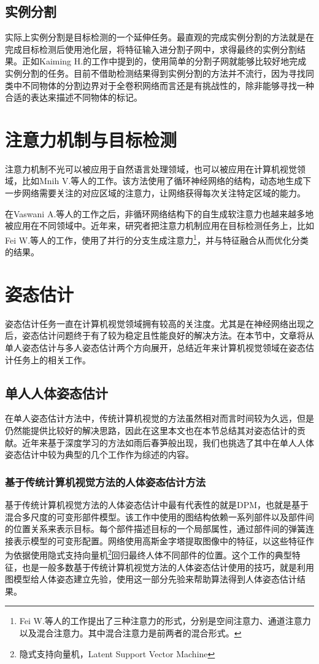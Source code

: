 \subsection{实例分割}
\label{subsec:insseg}
实际上实例分割是目标检测的一个延伸任务。最直观的完成实例分割的方法就是在完成目标检测后使用池化层，将特征输入进分割子网中，求得最终的实例分割结果。正如Kaiming H.\cite{He2017Mask}的工作中提到的，使用简单的分割子网就能够比较好地完成实例分割的任务。目前不借助检测结果得到实例分割的方法并不流行，因为寻找同类中不同物体的分割边界对于全卷积网络而言还是有挑战性的，除非能够寻找一种合适的表达来描述不同物体的标记。

\section{注意力机制与目标检测}
\label{sec:attenandobjdet}
注意力机制不光可以被应用于自然语言处理领域，也可以被应用在计算机视觉领域，比如Mnih V.等人的工作\cite{mnih2014recurrent}。该方法使用了循环神经网络的结构，动态地生成下一步网络需要关注的对应区域的注意力，让网络获得每次关注特定区域的能力。

在Vaswani A.等人的工作\cite{vaswani2017attention}之后，非循环网络结构下的自生成软注意力也越来越多地被应用在不同领域中。近年来，研究者把注意力机制应用在目标检测任务上，比如Fei W.等人的工作\cite{wang2017residual}，使用了并行的分支生成注意力\footnote{Fei W.等人的工作提出了三种注意力的形式，分别是空间注意力、通道注意力以及混合注意力。其中混合注意力是前两者的混合形式。}，并与特征融合从而优化分类的结果。

\section{姿态估计}
\label{sec:poseestimation}
姿态估计任务一直在计算机视觉领域拥有较高的关注度。尤其是在神经网络出现之后，姿态估计问题终于有了较为稳定且性能良好的解决方法。在本节中，文章将从单人姿态估计与多人姿态估计两个方向展开，总结近年来计算机视觉领域在姿态估计任务上的相关工作。
\subsection{单人人体姿态估计}
\label{subsec:singlepose}
在单人姿态估计方法中，传统计算机视觉的方法虽然相对而言时间较为久远，但是仍然能提供比较好的解决思路，因此在这里本文也在本节总结其对姿态估计的贡献。近年来基于深度学习的方法如雨后春笋般出现，我们也挑选了其中在单人人体姿态估计中较为典型的几个工作作为综述的内容。
\subsubsection{基于传统计算机视觉方法的人体姿态估计方法}
\label{subsubsec:legacypose}
基于传统计算机视觉方法的人体姿态估计中最有代表性的就是DPM\cite{felzenszwalb2010object}，也就是基于混合多尺度的可变形部件模型。该工作中使用的图结构依赖一系列部件以及部件间的位置关系来表示目标。每个部件描述目标的一个局部属性，通过部件间的弹簧连接表示模型的可变形配置。网络使用高斯金字塔提取图像中的特征，以这些特征作为依据使用隐式支持向量机\footnote{隐式支持向量机，Latent Support Vector Machine}回归最终人体不同部件的位置。这个工作的典型特征，也是一般多数基于传统计算机视觉方法的人体姿态估计使用的技巧，就是利用图模型给人体姿态建立先验，使用这一部分先验来帮助算法得到人体姿态估计结果。
